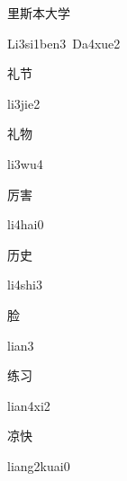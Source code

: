 \begin{verbete}{里斯本大学}
\begin{pronuncia}[\\]{Li3si1ben3\ Da4xue2}
\end{pronuncia}
\end{verbete}

\begin{verbete}[li3jie2]{礼节}
\begin{pronuncia}{li3jie2}
\end{pronuncia}
\end{verbete}

\begin{verbete}[li3wu4]{礼物}
\begin{pronuncia}{li3wu4}
\end{pronuncia}
\end{verbete}

\begin{verbete}[li4hai0]{厉害}
\begin{pronuncia}{li4hai0}
\end{pronuncia}
\end{verbete}

\begin{verbete}[li4shi3]{历史}
\begin{pronuncia}{li4shi3}
\end{pronuncia}
\end{verbete}

\begin{verbete}[lian3]{脸}
\begin{pronuncia}{lian3}
\end{pronuncia}
\end{verbete}

\begin{verbete}[lian4xi2]{练习}
\begin{pronuncia}{lian4xi2}
\end{pronuncia}
\end{verbete}

\begin{verbete}{凉快}
\begin{pronuncia}{liang2kuai0}
\end{pronuncia}
\end{verbete}

